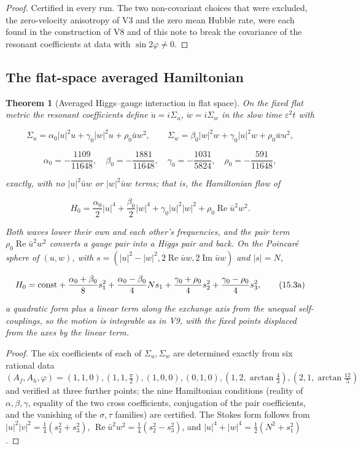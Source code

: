 \documentclass[11pt]{article}
\newtheorem{theorem}{Theorem}[section]
\theoremstyle{remark}
\begin{document}
\begin{proof}
Certified in every run.  The two non-covariant choices that were
excluded, the zero-velocity anisotropy of V3 and the zero mean Hubble
rate, were each found in the construction of V8 and of this note to
break the covariance of the resonant coefficients at data with
\(\sin2\varphi\neq0\).
\end{proof}

\subsection{The flat-space averaged Hamiltonian}

\begin{theorem}[Averaged Higgs--gauge interaction in flat space]
\label{thm:v20v12-flat}
On the fixed flat metric the resonant coefficients define
\(\dot u=i\Sigma_u\), \(\dot w=i\Sigma_w\) in the slow time
\(\varepsilon^2t\) with

\[
 \Sigma_u=\alpha_0|u|^2u+\gamma_0|w|^2u+\rho_0\bar uw^2,\qquad
 \Sigma_w=\beta_0|w|^2w+\gamma_0|u|^2w+\rho_0\bar wu^2,               \tag{15.1}
\]

\[
 \alpha_0=-\frac{1109}{11648},\quad\beta_0=-\frac{1881}{11648},\quad
 \gamma_0=-\frac{1031}{5824},\quad\rho_0=-\frac{591}{11648},          \tag{15.2}
\]

exactly, with no \(|u|^2\bar uw\) or \(|w|^2\bar uw\) terms; that is,
the Hamiltonian flow of

\[
 H_0=\frac{\alpha_0}2|u|^4+\frac{\beta_0}2|w|^4+\gamma_0|u|^2|w|^2+\rho_0\operatorname{Re}\bar u^2w^2.
                                                                    \tag{15.3}
\]

Both waves lower their own and each other's frequencies, and the pair
term \(\rho_0\operatorname{Re}\bar u^2w^2\) converts a gauge pair into a
Higgs pair and back.  On the Poincar\'e sphere of \((u,w)\), with
\(s=(|u|^2-|w|^2,2\operatorname{Re}\bar uw,2\operatorname{Im}\bar uw)\)
and \(|s|=N\),

\[
 H_0=\hbox{const}+\frac{\alpha_0+\beta_0}8s_1^2+\frac{\alpha_0-\beta_0}4Ns_1
 +\frac{\gamma_0+\rho_0}4s_2^2+\frac{\gamma_0-\rho_0}4s_3^2,             \tag{15.3a}
\]

a quadratic form plus a linear term along the exchange axis from the
unequal self-couplings, so the motion is integrable as in V9, with the
fixed points displaced from the axes by the linear term.
\end{theorem}

\begin{proof}
The six coefficients of each of \(\Sigma_u,\Sigma_w\) are determined
exactly from six rational data
\((A_f,A_h,\varphi)=(1,1,0),(1,1,\tfrac\pi2),(1,0,0),(0,1,0),(1,2,\arctan\tfrac43),(2,1,\arctan\tfrac{12}5)\)
and verified at three further points; the nine Hamiltonian conditions
(reality of \(\alpha,\beta,\gamma\), equality of the two cross
coefficients, conjugation of the pair coefficients, and the vanishing
of the \(\sigma,\tau\) families) are certified.  The Stokes form
follows from \(|u|^2|v|^2=\tfrac14(s_2^2+s_3^2)\),
\(\operatorname{Re}\bar u^2w^2=\tfrac14(s_2^2-s_3^2)\), and
\(|u|^4+|w|^4=\tfrac12(N^2+s_1^2)\).
\end{proof}
\end{document}
